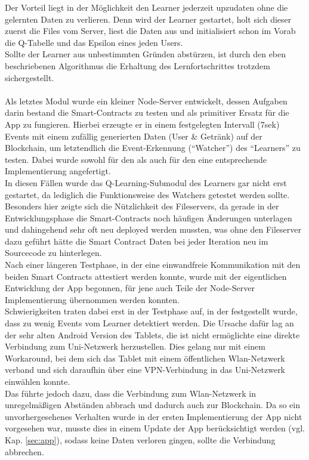 Der Vorteil liegt in der Möglichkeit den Learner jederzeit upzudaten ohne die gelernten Daten zu verlieren. Denn wird der Learner gestartet, holt sich dieser zuerst die Files vom Server, liest die Daten aus und initialisiert schon im Vorab die Q-Tabelle und das Epsilon eines jeden Users. \\
Sollte der Learner aus unbestimmten Gründen abstürzen, ist durch den eben beschriebenen Algorithmus die Erhaltung des Lernfortschrittes trotzdem sichergestellt.\\\\
Als letztes Modul wurde ein kleiner Node-Server entwickelt, dessen Aufgaben darin bestand die Smart-Contracts zu testen und als primitiver Ersatz für die App zu fungieren. Hierbei erzeugte er in einem festgelegten Intervall (7sek) Events mit einem zufällig generierten Daten (User \& Getränk) auf der Blockchain, um letztendlich die Event-Erkennung (“Watcher”) des “Learners” zu testen. Dabei wurde sowohl für den  als auch für den  eine entsprechende Implementierung angefertigt.
\\In diesen Fällen wurde das Q-Learning-Submodul des Learners gar nicht erst gestartet, da lediglich die Funktionsweise des Watchers getestet werden sollte.\\
Besonders hier zeigte sich die Nützlichkeit des Fileservers, da gerade in der Entwicklungsphase die Smart-Contracts noch häufigen Änderungen unterlagen und dahingehend sehr oft neu deployed werden mussten, was ohne den Fileserver dazu geführt hätte die Smart Contract Daten bei jeder Iteration neu im Sourcecode zu hinterlegen.\\
Nach einer längeren Testphase, in der eine einwandfreie Kommunikation mit den beiden Smart Contracts attestiert werden konnte, wurde mit der eigentlichen Entwicklung der App begonnen, für jene auch Teile der Node-Server Implementierung übernommen werden konnten.\\
Schwierigkeiten traten dabei erst in der Testphase auf, in der festgestellt wurde, dass zu wenig Events vom Learner detektiert werden. Die Ursache dafür lag an der sehr alten Android Version des Tablets, die ist nicht ermöglichte eine direkte Verbindung zum Uni-Netzwerk herzustellen. Dies gelang nur mit einem Workaround, bei dem sich das Tablet mit einem öffentlichen Wlan-Netzwerk verband und sich daraufhin über eine VPN-Verbindung in das Uni-Netzwerk einwählen konnte. \\
Das führte jedoch dazu, dass die Verbindung zum Wlan-Netzwerk in unregelmäßigen Abständen abbrach und dadurch auch zur Blockchain. Da so ein unvorhergesehenes Verhalten wurde in der ersten Implementierung der App nicht vorgesehen war, musste dies in einem Update der App berücksichtigt werden (vgl. Kap. \ref{sec:app}), sodass keine Daten verloren gingen, sollte die Verbindung abbrechen. \\
